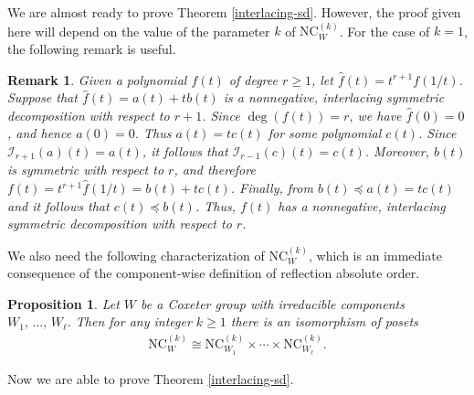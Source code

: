\documentclass[12pt]{article}
\newtheorem{prop}[thm]{Proposition}
\newtheorem{rem}[thm]{Remark}
\newcommand{\NC}{\mathrm{NC}}
\numberwithin{equation}{section}
\begin{document}
We are almost ready to prove Theorem \ref{interlacing-sd}. However, the proof given here will depend on the value of the parameter $k$ of
$\NC^{(k)}_W$. For the case of $k=1$, the following remark is useful. 

\begin{rem}\label{rem_reciprocity}
Given a polynomial $f(t)$ of degree $r\geq 1$, let $\hat{f}(t)=t^{r+1}f(1/t)$. 
Suppose that $\hat{f}(t)=a(t)+tb(t)$ is a nonnegative, interlacing symmetric decomposition
with respect to $r+1$. 
Since $\deg(f(t))=r$, we have $\hat{f}(0)=0$, and hence $a(0)=0$. 
Thus $a(t)=tc(t)$ for some polynomial $c(t)$. 
Since $\mathcal{I}_{r+1}(a)(t)=a(t)$, it follows that $\mathcal{I}_{r-1}(c)(t)=c(t)$. Moreover, $b(t)$ is symmetric with respect to $r$, and therefore $f(t)=t^{r+1}\hat{f}(1/t)=b(t)+tc(t)$.
Finally, from $b(t)\preceq a(t)=tc(t)$ and \cite[Section 3]{Wagner-1992} it follows that $c(t)\preceq b(t)$. Thus, $f(t)$ has a nonnegative, interlacing symmetric decomposition with respect to $r$.
\end{rem}


We also need the following characterization of $\NC^{(k)}_W$, which is an immediate consequence of the component-wise definition of reflection absolute order. %

\begin{prop}\label{prop:NCk-product-irreducible}
Let $W$ be a Coxeter group with irreducible components $W_1,\,\ldots,\,W_\ell.$ 
Then for any integer $k\geq 1$ {there is an isomorphism of posets} %
\begin{align*}
\NC_W^{(k)}\cong\NC_{W_1}^{(k)}\times\cdots\times \NC_{W_\ell}^{(k)}.    
\end{align*}
\end{prop}
Now we are able to prove Theorem \ref{interlacing-sd}.
\end{document}
